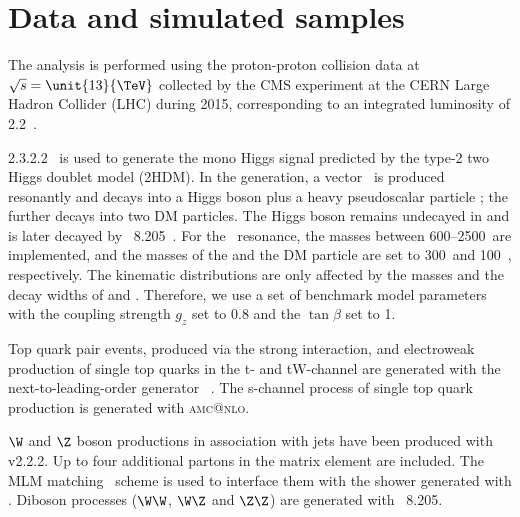 \section{Data and simulated samples}

The analysis is performed using the proton-proton collision data at 
$\sqrt{s} = \unit{13}{\TeV}$ collected by the CMS experiment at the CERN 
Large Hadron Collider (LHC) during 2015, corresponding to an integrated 
luminosity of 2.2~\fbinv. 

 2.3.2.2~\cite{bib:MADGRAPH} is used to generate the mono Higgs 
signal predicted by the type-2 two Higgs doublet model (2HDM). In the 
\MADGRAPH generation, a vector \cPZpr\ is produced resonantly and decays 
into a Higgs boson plus a heavy pseudoscalar particle \Az; the \Az further 
decays into two DM particles. The Higgs boson remains undecayed in \MADGRAPH 
and is later decayed by 
\PYTHIA~8.205~\cite{Sjostrand:2006za,Sjostrand:2014zea}. 
For the \cPZpr\ resonance, the masses between 600--2500~\GeV are implemented, 
and the masses of the \Az and the DM particle are set to 300~\GeV and 100~\GeV,
respectively. The kinematic distributions are only affected by the 
masses and the decay widths of \cPZpr and \Az. Therefore, we use a set of 
benchmark model parameters with the coupling strength $g_z$ set to 0.8 and 
the $\tan \beta$ set to 1. 

Top quark pair events, produced via the strong interaction,
and electroweak production of single top quarks in the t- and tW-channel
are generated with the next-to-leading-order generator
\POWHEG~\cite{Nason:2004rx,Frixione:2007vw,Alioli:2010xd,Frixione:2007nw,Re:2010bp}.
The s-channel process of single top quark production
is generated with \textsc{amc@nlo}\~\cite{bib:MADGRAPH}.



$\W$ and $\Z$ boson productions in association with jets have been produced 
with  v2.2.2. 
Up to four additional partons in the matrix element are included. 
The MLM matching~\cite{mlm} scheme is used to interface them with the shower 
generated with \PYTHIA.
Diboson processes ($\W\W$, $\W\Z$ and $\Z\Z$) are generated
with \PYTHIA~8.205.

